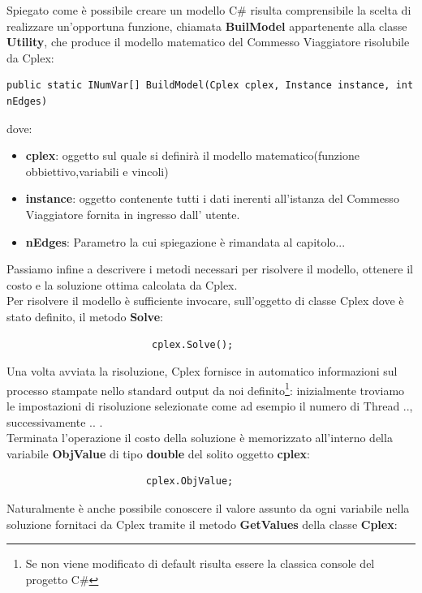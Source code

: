 \documentclass[11pt]{article}
\begin{document}
Spiegato come è possibile creare un modello C\# risulta comprensibile la scelta di realizzare un'opportuna funzione, chiamata \textbf{BuilModel} appartenente alla classe \textbf{Utility}, che produce il modello matematico del Commesso Viaggiatore risolubile da Cplex:

\begin{lstlisting}
public static INumVar[] BuildModel(Cplex cplex, Instance instance, int nEdges)
\end{lstlisting}

dove:

\begin{itemize}
\item \textbf{cplex}: oggetto sul quale si definirà il modello matematico(funzione obbiettivo,variabili e vincoli)
\item \textbf{instance}: oggetto contenente tutti i dati inerenti all'istanza del Commesso Viaggiatore fornita in ingresso dall' utente.
\item \textbf{nEdges}: Parametro la cui spiegazione è rimandata al capitolo...
\end{itemize}

Passiamo infine a descrivere i metodi necessari per risolvere il modello, ottenere il costo e la soluzione ottima calcolata da Cplex.\\

Per risolvere il modello è sufficiente invocare, sull'oggetto di classe Cplex dove è stato definito, il metodo \textbf{Solve}:

\begin{lstlisting}
                         cplex.Solve();
\end{lstlisting}

Una volta avviata la risoluzione, Cplex fornisce in automatico informazioni sul processo stampate nello standard output da noi definito\footnote{Se non viene modificato di default risulta essere la classica console del progetto C\#}: inizialmente troviamo le impostazioni di risoluzione selezionate come ad esempio il numero di Thread .., successivamente ..  .\\
Terminata l'operazione il costo della soluzione è memorizzato all'interno della variabile \textbf{ObjValue} di tipo \textbf{double} del solito oggetto \textbf{cplex}:

\begin{lstlisting}
                        cplex.ObjValue; 
\end{lstlisting}

Naturalmente è anche possibile conoscere il valore assunto da ogni variabile nella soluzione fornitaci da Cplex tramite il metodo \textbf{GetValues} della classe \textbf{Cplex}:
\end{document}
